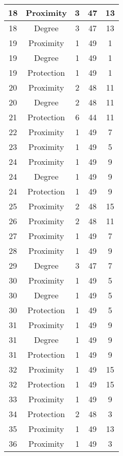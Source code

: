 \documentclass[results.tex]{subfiles}
\begin{document}
\begin{center}
\begin{tabular}{| c || c | c | c | c |}
    \hline
    18 & Proximity & 3 & 47 & 13 \\ 
    \hline
    18 & Degree & 3 & 47 & 13 \\ 
    \hline
    19 & Proximity & 1 & 49 & 1 \\ 
    \hline
    19 & Degree & 1 & 49 & 1 \\ 
    \hline
    19 & Protection & 1 & 49 & 1 \\ 
    \hline
    20 & Proximity & 2 & 48 & 11 \\ 
    \hline
    20 & Degree & 2 & 48 & 11 \\ 
    \hline
    21 & Protection & 6 & 44 & 11 \\ 
    \hline
    22 & Proximity & 1 & 49 & 7 \\ 
    \hline
    23 & Proximity & 1 & 49 & 5 \\ 
    \hline
    24 & Proximity & 1 & 49 & 9 \\ 
    \hline
    24 & Degree & 1 & 49 & 9 \\ 
    \hline
    24 & Protection & 1 & 49 & 9 \\ 
    \hline
    25 & Proximity & 2 & 48 & 15 \\ 
    \hline
    26 & Proximity & 2 & 48 & 11 \\ 
    \hline
    27 & Proximity & 1 & 49 & 7 \\ 
    \hline
    28 & Proximity & 1 & 49 & 9 \\ 
    \hline
    29 & Degree & 3 & 47 & 7 \\ 
    \hline
    30 & Proximity & 1 & 49 & 5 \\ 
    \hline
    30 & Degree & 1 & 49 & 5 \\ 
    \hline
    30 & Protection & 1 & 49 & 5 \\ 
    \hline
    31 & Proximity & 1 & 49 & 9 \\ 
    \hline
    31 & Degree & 1 & 49 & 9 \\ 
    \hline
    31 & Protection & 1 & 49 & 9 \\ 
    \hline
    32 & Proximity & 1 & 49 & 15 \\ 
    \hline
    32 & Protection & 1 & 49 & 15 \\ 
    \hline
    33 & Proximity & 1 & 49 & 9 \\ 
    \hline
    34 & Protection & 2 & 48 & 3 \\ 
    \hline
    35 & Proximity & 1 & 49 & 13 \\ 
    \hline
    36 & Proximity & 1 & 49 & 3 \\ 

\end{tabular}
\end{center}
\end{document}
